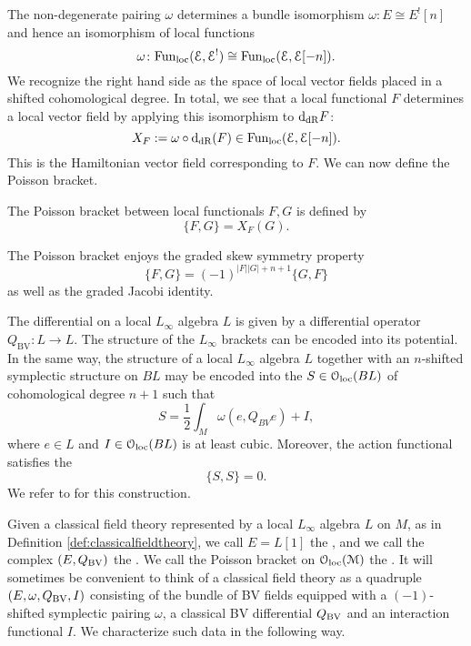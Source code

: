 \documentclass[10pt, oneside]{article}
\begin{document}
The non-degenerate pairing $\omega$ determines a bundle isomorphism $\omega \colon E \cong E^! [n]$ and hence an isomorphism of local functions
\[
\omega \colon {\rm Fun}_{\rm loc}(\mathcal E, \mathcal E^!) \cong {\rm Fun}_{\rm loc}(\mathcal E, \mathcal E[-n]) .
\]
We recognize the right hand side as the space of local vector fields placed in a shifted cohomological degree.
In total, we see that a local functional $F$ determines a local vector field by applying this isomorphism to ${\rm d}_{\mathrm{dR}}F$:
\[
X_F := \omega \circ {\rm d}_{\mathrm{dR}} (F) \in  {\rm Fun}_{\rm loc}(\mathcal E, \mathcal E[-n])  .
\]
This is the Hamiltonian vector field corresponding to $F$.  We can now define the Poisson bracket.

\begin{definition}
The Poisson bracket between local functionals $F, G$ is defined by
\[\{F, G\} = X_F (G).\]
\end{definition}

The Poisson bracket enjoys the graded skew symmetry property
\[\{F, G\} = (-1)^{|F||G|+n+1} \{G, F\}\]
as well as the graded Jacobi identity.

The differential on a local $L_\infty$ algebra $L$ is given by a differential operator $Q_{\mathrm{BV}}\colon L\rightarrow L$. The structure of the $L_\infty$ brackets can be encoded into its potential. In the same way, the structure of a local $L_\infty$ algebra $L$ together with an $n$-shifted symplectic structure on $BL$ may be encoded into the  $S\in\mathcal{O}_{\rm loc}(BL)$ of cohomological degree $n+1$ such that
\[S = \frac{1}{2}\int_M\omega(e, Q_{BV} e) + I,\]
where $e\in L$ and $I\in\mathcal{O}_{\rm loc}(BL)$ is at least cubic. Moreover, the action functional satisfies the 
\[\{S, S\} = 0.\]
We refer to \cite[Proposition 5.4.0.2]{Book2} for this construction.

Given a classical field theory represented by a local $L_\infty$ algebra $L$ on $M$, as in Definition \ref{def:classicalfieldtheory}, we call $E=L[1]$ the , and we call the complex $(E, Q_{\mathrm{BV}})$ the . We call the Poisson bracket on $\mathcal{O}_{\rm loc}(\mathcal M)$ the . It will sometimes be convenient to think of a classical field theory as a quadruple $(E, \omega, Q_{\mathrm{BV}}, I)$ consisting of the bundle of BV fields equipped with a $(-1)$-shifted symplectic pairing $\omega$, a classical BV differential $Q_{\mathrm{BV}}$ and an interaction functional $I$.  We characterize such data in the following way.
\end{document}
